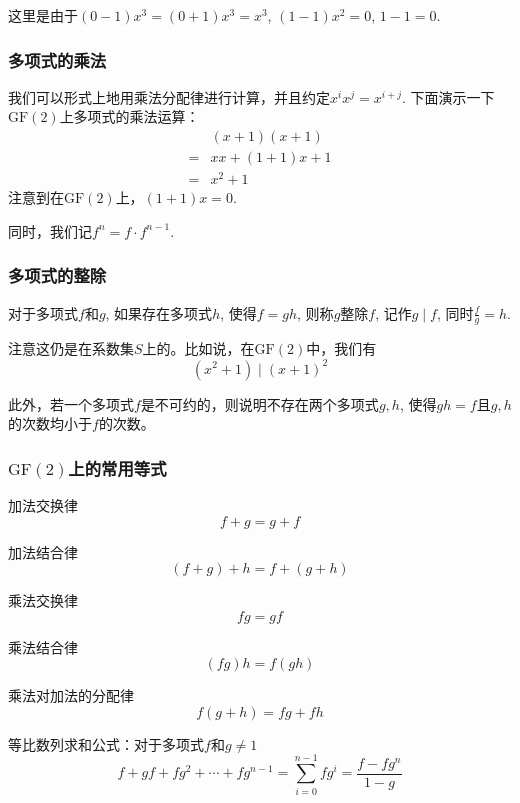 \documentclass[UTF8]{ctexrep}
\newcommand{\ext}{\displaystyle}
\def\pth#1{\left( {#1}\right)}
\def\GF{\mathrm{GF}}
\begin{document}
这里是由于$\pth{0-1}x^3=\pth{0+1}x^3=x^3$, $\pth{1-1}x^2=0$, $1-1=0$.
\subsubsection{多项式的乘法}
我们可以形式上地用乘法分配律进行计算，并且约定$x^ix^j=x^{i+j}$. 下面演示一下$\GF\pth{2}$上多项式的乘法运算：
\begin{align*}
    &\pth{x+1}\pth{x+1}\\
    =&xx+\pth{1+1}x+1\\
    =&x^2+1
\end{align*}
注意到在$\GF\pth{2}$上，$\pth{1+1}x=0$.\par
同时，我们记$f^n=f\cdot f^{n-1}$.
\subsubsection{多项式的整除}
对于多项式$f$和$g$, 如果存在多项式$h$, 使得$f=gh$, 则称$g$整除$f$, 记作$g\mid f$, 同时$\ext \frac{f}{g}=h$.\par
注意这仍是在系数集$S$上的。比如说，在$\GF\pth{2}$中，我们有
\[\pth{x^2+1}\mid\pth{x+1}^2\]

此外，若一个多项式$f$是不可约的，则说明不存在两个多项式$g, h$, 使得$gh=f$且$g, h$的次数均小于$f$的次数。
\subsubsection{$\GF\pth{2}$上的常用等式}
加法交换律
\begin{equation}
    f+g=g+f
\end{equation}

加法结合律
\begin{equation}
    \pth{f+g}+h=f+\pth{g+h}
\end{equation}

乘法交换律
\begin{equation}
    fg=gf
\end{equation}

乘法结合律
\begin{equation}
    \pth{fg}h=f\pth{gh}
\end{equation}

乘法对加法的分配律
\begin{equation}
    f\pth{g+h}=fg+fh
\end{equation}

等比数列求和公式：对于多项式$f$和$g\neq 1$
\begin{equation}
    f+gf+fg^2+\cdots +fg^{n-1}=\sum_{i=0}^{n-1}fg^{i}=\frac{f-fg^{n}}{1-g}
\end{equation}
\end{document}
